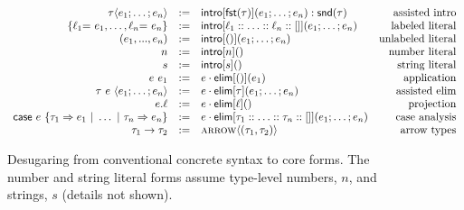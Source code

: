 \begin{figure}[t]
\small
\[
\begin{array}{rclr}
\tau\langle e_1; \ldots; e_n \rangle & := & \FF{intro}[\tfst{\tau}](e_1; \ldots; e_n) : \tsnd{\tau} & \text{assisted intro}\\
\{ \ell_1{=}~e_1, \ldots, \ell_n{=}~e_n \} & := & \FF{intro}[\ell_1 :: \ldots :: \ell_n :: []](e_1; \ldots; e_n) & \text{labeled literal}  \\
(e_1, ..., e_n) & := & \FF{intro}[()](e_1; \ldots; e_n) & \text{unlabeled literal}\\
n & := & \FF{intro}[n]() & \text{number literal} \\
s & := & \FF{intro}[s]() & \text{string literal}\\
e~e_1 & := & e\cdot\FF{elim}[()](e_1) & \text{application}\\
\tau~e~\langle e_1; \ldots; e_n \rangle  & := & e\cdot\FF{elim}[\tau](e_1; \ldots; e_n) & \text{assisted elim}\\
e.\ell & := & e\cdot\FF{elim}[\ell]() & \text{projection}\\
\F{case}e~\{\tau_1 \Rightarrow e_1~|~\ldots~|~\tau_n \Rightarrow e_n\} & := & e\cdot\FF{elim}[\tau_1 :: \ldots :: \tau_n :: []](e_1; \ldots; e_n) & \text{case analysis}\\
\tau_1 \rightarrow \tau_2 & := & \ttype{arrow}{(\tau_1, \tau_2)} & \text{arrow types}\\
%
\end{array}
\]
\vspace{-10pt}
\caption{\small Desugaring from conventional concrete syntax to core forms. The number and string literal forms assume type-level numbers, $n$, and strings, $s$ (details not shown).}
\label{desugaring}
\end{figure}


